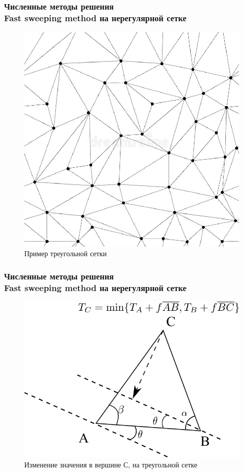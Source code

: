 \documentclass[hyperref={unicode=true},professionalfont]{beamer}
\newcommand{\stamp}{
	\begin{frame}[plain,noframenumbering]
		\begin{table}[h!]
			\flushright
			\vspace{5cm}
			\begin{adjustbox}{max width=0.7\textwidth}
				\begin{tabular}{
					|>{\footnotesize}p{0.8cm}|
					>{\footnotesize}p{0.8cm}|
					>{\footnotesize}p{2.2cm}|
					>{\footnotesize}p{1.1cm}|
					>{\footnotesize}p{0.8cm}|
					>{\footnotesize}p{5cm}|
					>{\footnotesize}p{0.1cm}|
					>{\footnotesize}p{0.1cm}|
					>{\footnotesize}p{0.1cm}|
					>{\footnotesize}p{0.8cm}|
					>{\footnotesize}p{1.4cm}|
				}
					\hline
					&&&&& \multicolumn{6}{>{\footnotesize}c|}{\multirow{3}{*}{\Large 0.043.00.00 ПЗ}} \\ \cline{1-5}
					&&&&& \multicolumn{6}{>{\footnotesize}c|}{} \\ \cline{1-5}
					Изм. & Лист & № Документа & Подпись & Дата & \multicolumn{6}{>{\footnotesize}c|}{} \\ \hline
					\multicolumn{2}{|>{\footnotesize}l|}{Разработал}
                    & Апанович Д.В. &  &  &
                                            \multirow{4}{5cm}{\centering
                                            Параллельный алгоритм
                                            численного решения
                                            анизотропного уравнения эйконала} & \multicolumn{3}{>{\footnotesize}l|}{Лит.} & Лист & Листов \\ \cline{1-5}\cline{7-11}
					\multicolumn{2}{|>{\footnotesize}l|}{Проверил}
                    & Казаков А.Л. &  &  &  & У & & & \insertframenumber & \inserttotalframenumber \\ \cline{1-5}\cline{7-11}
					\multicolumn{2}{|>{\footnotesize}l|}{Нормоконтролер}
                    & Казаков А.Л. &  &  &  & \multicolumn{5}{>{\footnotesize}l|}{} \\ \cline{1-5}
					\multicolumn{2}{|>{\footnotesize}l|}{} &  &  &  &  & \multicolumn{5}{>{\footnotesize}l|}{Кафедра АС, гр. ИСТм-16-1} \\ \cline{1-5}
					\multicolumn{2}{|>{\footnotesize}l|}{Утвердил}
                    & Бахвалов С.В. &  &  &  & \multicolumn{5}{>{\footnotesize}l|}{} \\ \hline

				\end{tabular}
			\end{adjustbox}
		\end{table}

	\end{frame}
}
\renewcommand{\stamp}{}
\begin{document}
\begin{frame}


  \frametitle{Численные методы решения \\Fast sweeping method на нерегулярной сетке}
  
\begin{figure}[H]
  \centering
  \includegraphics[width=0.5\linewidth]{triangle-mesh.png}
  \hfil \caption{Пример треугольной сетки}
  \label{fig:triangle-front}

\end{figure}

  
\end{frame}
\stamp


\begin{frame}
  \frametitle{Численные методы решения \\Fast sweeping method на нерегулярной сетке}
  
\begin{figure}[H]
  \centering
  \includegraphics[width=0.7\linewidth]{triangle-front-slide.png}
  \hfil \caption{Изменение значения в вершине С, на треугольной сетке}
  \label{fig:triangle-front}

\end{figure}

  
\end{frame}
\stamp
\end{document}
